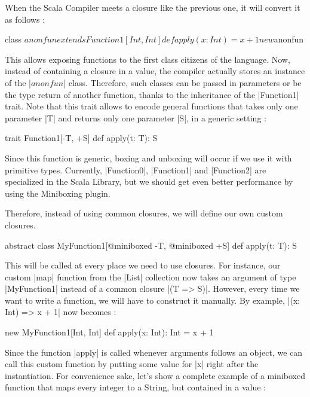 When the Scala Compiler meets a closure like the previous one, it will convert it as follows :

\begin{lstlisting-nobreak}
 {
  class $anonfun extends Function1[Int, Int] {
    def apply(x: Int) = x + 1
  }
  
  new $anonfun
 }
\end{lstlisting-nobreak}

This allows exposing functions to the first class citizens of the language. Now, instead of containing a closure in a value, the compiler actually stores an instance of the |$anonfun$| class. Therefore, such classes can be passed in parameters or be the type return of another function, thanks to the inheritance of the |Function1| trait. Note that this trait allows to encode general functions that takes only one parameter |T| and returns only one parameter |S|, in a generic setting :

\begin{lstlisting-nobreak}
 trait Function1[-T, +S] {
   def apply(t: T): S
 }
\end{lstlisting-nobreak}

Since this function is generic, boxing and unboxing will occur if we use it with primitive types. Currently, |Function0|, |Function1| and |Function2| are specialized in the Scala Library, but we should get even better performance by using the Miniboxing plugin.

Therefore, instead of using common closures, we will define our own custom closures. 

\begin{lstlisting-nobreak}
 abstract class MyFunction1[@miniboxed -T, @miniboxed +S] {
   def apply(t: T): S
 }
\end{lstlisting-nobreak}

This will be called at every place we need to use closures. For instance, our custom |map| function from the |List| collection now takes an argument of type |MyFunction1| instead of a common closure |(T => S)|. However, every time we want to write a function, we will have to construct it manually. By example, |(x: Int) => x + 1| now becomes :

\begin{lstlisting-nobreak}
 new MyFunction1[Int, Int] {
   def apply(x: Int): Int = x + 1
 }
\end{lstlisting-nobreak}

Since the function |apply| is called whenever arguments follows an object, we can call this custom function by putting some value for |x| right after the instantiation. For convenience sake, let's show a complete example of a miniboxed function that maps every integer to a String, but contained in a value :

